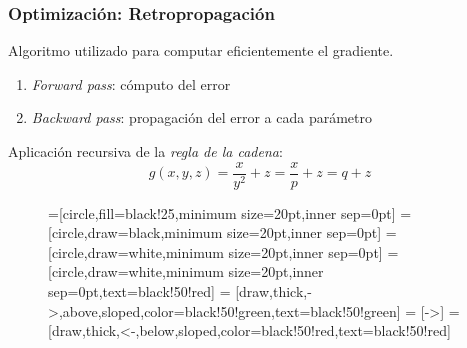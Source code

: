 \documentclass{beamer}
\begin{document}
\begin{frame}
\frametitle{Optimización: Retropropagación}
\vfill
Algoritmo utilizado para computar eficientemente el gradiente.
\vfill
\begin{enumerate}
    \item \textit{Forward pass}: cómputo del error
    \item \textit{Backward pass}: propagación del error a cada parámetro
\end{enumerate}
\vfill
Aplicación recursiva de la \textit{regla de la cadena}:
\vfill
\begin{equation}
    g(x,y,z) = \frac{x}{y^2} + z = \frac{x}{p} + z = q + z
\end{equation}
\vfill
\begin{figure}[H]
    \centering
    =[circle,fill=black!25,minimum size=20pt,inner sep=0pt]
    =[circle,draw=black,minimum size=20pt,inner sep=0pt]
    =[circle,draw=white,minimum size=20pt,inner sep=0pt]
    =[circle,draw=white,minimum size=20pt,inner sep=0pt,text=black!50!red]
     = [draw,thick,->,above,sloped,color=black!50!green,text=black!50!green]
     = [->]
     = [draw,thick,<-,below,sloped,color=black!50!red,text=black!50!red]
\end{figure}
\end{frame}
\end{document}
